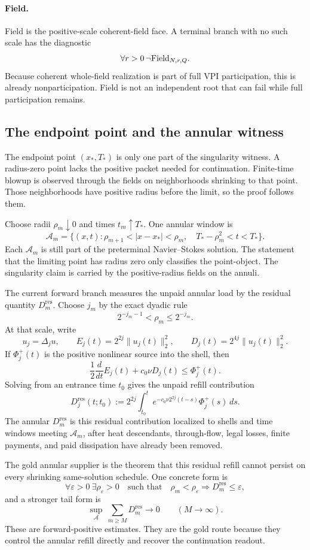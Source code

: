 \paragraph{Field.}
Field is the positive-scale coherent-field face.  A terminal branch with no
such scale has the diagnostic
\[
  \forall r>0\,\neg\mathrm{Field}_{N,r,Q}.
\]
Because coherent whole-field realization is part of full VPI participation,
this is already nonparticipation.  Field is not an independent root that can
fail while full participation remains.

\subsection{The endpoint point and the annular witness}
\label{subsec:annular-limit-witness}

The endpoint point \((x_*,T_*)\) is only one part of the singularity witness.  A radius-zero point lacks the positive packet needed for continuation.  Finite-time blowup is observed through the fields on neighborhoods shrinking to that point.  Those neighborhoods have positive radius before the limit, so the proof follows them.

Choose radii \(\rho_m\downarrow0\) and times \(t_m\uparrow T_*\).  One annular window is
\[
  \mathcal A_m
  =
  \{(x,t):\rho_{m+1}<|x-x_*|<\rho_m,\quad
  T_*-\rho_m^2<t<T_*\}.
\]
Each \(\mathcal A_m\) is still part of the preterminal Navier--Stokes solution.  The statement that the limiting point has radius zero only classifies the point-object.  The singularity claim is carried by the positive-radius fields on the annuli.

The current forward branch measures the unpaid annular load by the residual quantity \(D_m^{\mathrm{res}}\).  Choose \(j_m\) by the exact dyadic rule
\[
  2^{-j_m-1}<\rho_m\le 2^{-j_m}.
\]
At that scale, write
\[
  u_j=\Delta_j u,\qquad
  E_j(t)=2^{2j}\|u_j(t)\|_2^2,\qquad
  D_j(t)=2^{4j}\|u_j(t)\|_2^2.
\]
If \(\Phi_j^+(t)\) is the positive nonlinear source into the shell, then
\[
  \frac12\frac{d}{dt}E_j(t)+c_0\nu D_j(t)\le \Phi_j^+(t).
\]
Solving from an entrance time \(t_0\) gives the unpaid refill contribution
\[
  D_j^{\mathrm{res}}(t;t_0)
  :=
  2^{2j}\int_{t_0}^{t}e^{-c_0\nu2^{2j}(t-s)}\Phi_j^+(s)\,ds.
\]
The annular \(D_m^{\mathrm{res}}\) is this residual contribution localized to shells and time windows meeting \(\mathcal A_m\), after heat descendants, through-flow, legal losses, finite payments, and paid dissipation have already been removed.

The gold annular supplier is the theorem that this residual refill cannot persist on every shrinking same-solution schedule.  One concrete form is
\[
  \forall\varepsilon>0\ \exists\rho_\varepsilon>0
  \quad\text{such that}\quad
  \rho_m<\rho_\varepsilon \Longrightarrow D_m^{\mathrm{res}}\le\varepsilon,
\]
and a stronger tail form is
\[
  \sup_{\mathcal A}\ \sum_{m\ge M}D_m^{\mathrm{res}}\longrightarrow0
  \qquad(M\to\infty).
\]
These are forward-positive estimates.  They are the gold route because they control the annular refill directly and recover the continuation readout.

